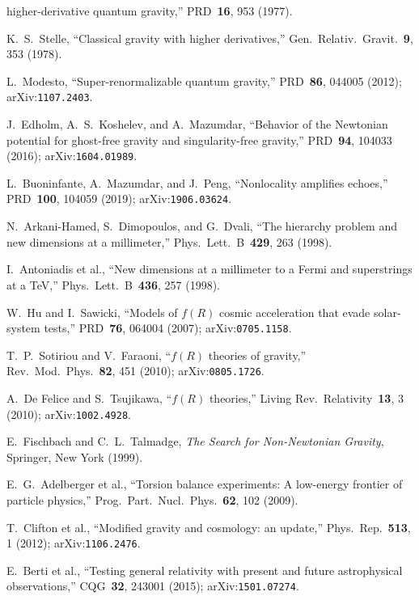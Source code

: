 \documentclass[11pt,a4paper]{article}
\begin{document}
\begin{enumerate}[label={[\arabic*]}, leftmargin=2em]
    higher-derivative quantum gravity,'' PRD~\textbf{16}, 953 (1977).
  \item\label{ref:stelle1978} K.~S.~Stelle, ``Classical gravity with
    higher derivatives,'' Gen.\ Relativ.\ Gravit.~\textbf{9}, 353 (1978).
  \item\label{ref:modesto2012} L.~Modesto, ``Super-renormalizable quantum
    gravity,'' PRD~\textbf{86}, 044005 (2012); arXiv:\texttt{1107.2403}.
  \item\label{ref:edholm2016} J.~Edholm, A.~S.~Koshelev, and A.~Mazumdar,
    ``Behavior of the Newtonian potential for ghost-free gravity and
    singularity-free gravity,'' PRD~\textbf{94}, 104033 (2016);
    arXiv:\texttt{1604.01989}.
  \item\label{ref:buoninfante2019} L.~Buoninfante, A.~Mazumdar, and J.~Peng,
    ``Nonlocality amplifies echoes,'' PRD~\textbf{100}, 104059 (2019);
    arXiv:\texttt{1906.03624}.
  \item\label{ref:add1998} N.~Arkani-Hamed, S.~Dimopoulos, and G.~Dvali,
    ``The hierarchy problem and new dimensions at a millimeter,''
    Phys.\ Lett.\ B~\textbf{429}, 263 (1998).
  \item\label{ref:antoniadis1998} I.~Antoniadis et al., ``New dimensions at
    a millimeter to a Fermi and superstrings at a TeV,''
    Phys.\ Lett.\ B~\textbf{436}, 257 (1998).
  \item\label{ref:hu2007} W.~Hu and I.~Sawicki, ``Models of $f(R)$ cosmic
    acceleration that evade solar-system tests,'' PRD~\textbf{76}, 064004
    (2007); arXiv:\texttt{0705.1158}.
  \item\label{ref:sotiriou2010} T.~P.~Sotiriou and V.~Faraoni, ``$f(R)$
    theories of gravity,'' Rev.\ Mod.\ Phys.~\textbf{82}, 451 (2010);
    arXiv:\texttt{0805.1726}.
  \item\label{ref:defelice2010} A.~De Felice and S.~Tsujikawa, ``$f(R)$
    theories,'' Living Rev.\ Relativity~\textbf{13}, 3 (2010);
    arXiv:\texttt{1002.4928}.
  \item\label{ref:fischbach1999} E.~Fischbach and C.~L.~Talmadge,
    \textit{The Search for Non-Newtonian Gravity}, Springer, New York (1999).
  \item\label{ref:adelberger2009} E.~G.~Adelberger et al., ``Torsion balance
    experiments: A low-energy frontier of particle physics,''
    Prog.\ Part.\ Nucl.\ Phys.~\textbf{62}, 102 (2009).
  \item\label{ref:clifton2012} T.~Clifton et al., ``Modified gravity and
    cosmology: an update,'' Phys.\ Rep.~\textbf{513}, 1 (2012);
    arXiv:\texttt{1106.2476}.
  \item\label{ref:berti2015} E.~Berti et al., ``Testing general relativity
    with present and future astrophysical observations,''
    CQG~\textbf{32}, 243001 (2015); arXiv:\texttt{1501.07274}.
\end{enumerate}
\end{document}
